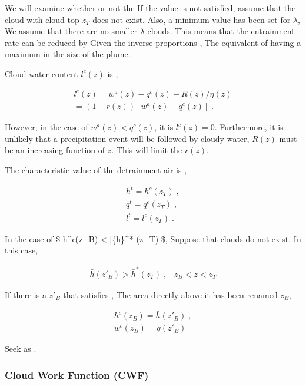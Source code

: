 We will examine whether or not the If the value is not satisfied, assume
that the cloud with cloud top \(z_T\) does not exist. Also, a minimum
value has been set for \(\lambda\), We assume that there are no smaller
\(\lambda\) clouds. This means that the entrainment rate can be reduced
by Given the inverse proportions , The equivalent of having a maximum in
the size of the plume.

Cloud water content \(l^c(z)\) is ,

\begin{eqnarray}
  l^c(z)  =  w^a(z)-q^c(z)-R(z)/\eta(z)   \\
          =  \left( 1-r(z) \right) \left[ w^a(z)-q^c(z) \right] \; .
\end{eqnarray}

However, in the case of \(w^a(z) < q^c(z)\), it is \(l^c(z)=0\).
Furthermore, it is unlikely that a precipitation event will be followed
by cloudy water, \(R(z)\) must be an increasing function of \(z\). This
will limit the \(r(z)\).

The characteristic value of the detrainment air is ,

\begin{eqnarray}
  h^t  =  h^c(z_T) \; , \\
  q^t  =  q^c(z_T) \; , \\
  l^t  =  l^c(z_T) \; .
\end{eqnarray}

In the case of \$ h\^{}c(z\_B) \textless{} \bar\{h\}\^{}* (z\_T) \$,
Suppose that clouds do not exist. In this case,

\begin{eqnarray}
  \bar{h}(z'_B) > \bar{h}^* (z_T) \; , \;\;\; z_B < z < z_T 
\end{eqnarray}

If there is a \(z'_B\) that satisfies , The area directly above it has
been renamed \(z_B\),

\begin{eqnarray}
  h^c(z_B)  =  \bar{h}(z'_B) \; , \\
  w^c(z_B)  =  \bar{q}(z'_B) \; 
\end{eqnarray}

Seek as .

\hypertarget{cloud-work-function-cwf}{%
\subsubsection{Cloud Work Function
(CWF)}\label{cloud-work-function-cwf}}

